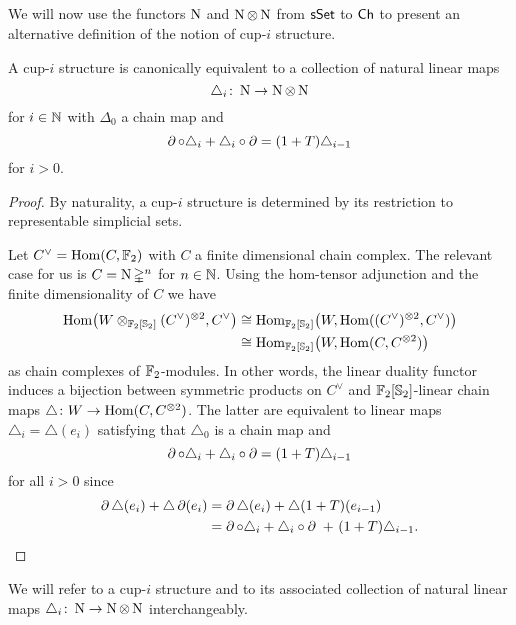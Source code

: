 
\subsection{}

We will now use the functors $\operatorname{N}$ and $\operatorname{N} \otimes \operatorname{N}$ from $\mathsf{sSet}$ to $\mathsf{Ch}$ to present an alternative definition of the notion of cup-$i$ structure.

\begin{lemma} \label{l:cup-i construction coalgebra}
	A cup-$i$ structure is canonically equivalent to a collection of natural linear maps
	\[
	\triangle_i \colon \operatorname{N} \to \operatorname{N} \otimes \operatorname{N}
	\]
	for $i \in \mathbb{N}$ with $\Delta_0$ a chain map and
	\[
	\operatorname{\partial} \circ \triangle_i + \triangle_i \circ \operatorname{\partial} =
	(1+T) \triangle_{i-1}
	\]
	for $i > 0$.
\end{lemma}

\begin{proof}
	By naturality, a cup-$i$ structure is determined by its restriction to representable simplicial sets.

	Let $C^\vee = \mathrm{Hom}(C, {\mathbb{F}_2})$ with $C$ a finite dimensional chain complex.
	The relevant case for us is $C = \operatorname{N} \mathbb{\Delta}^n$ for $n \in \mathbb{N}$.
	Using the hom-tensor adjunction and the finite dimensionality of $C$ we have
	\begin{align*}
	\mathrm{Hom} \big(W \otimes_{{\mathbb{F}_2}[\mathbb{S}_2]} (C^\vee)^{\otimes 2}, C^\vee \big) & \cong
	\mathrm{Hom}_{{\mathbb{F}_2}[\mathbb{S}_2]} \big( W, \mathrm{Hom}((C^\vee)^{\otimes 2}, C^\vee) \big) \\ & \cong
	\mathrm{Hom}_{{\mathbb{F}_2}[\mathbb{S}_2]} \big( W, \mathrm{Hom}(C, C^{\otimes 2}) \big)
	\end{align*}
	as chain complexes of ${\mathbb{F}_2}$-modules.
	In other words, the linear duality functor induces a bijection between symmetric products on $C^\vee$ and ${\mathbb{F}_2}[\mathbb{S}_2]$-linear chain maps $\triangle \colon W \to \mathrm{Hom}(C, C^{\otimes 2})$.
	The latter are equivalent to linear maps $\triangle_i = \triangle(e_i)$ satisfying that $\triangle_0$ is a chain map and
	\[
	\operatorname{\partial} \circ \triangle_i + \triangle_i \circ \operatorname{\partial} =
	(1+T) \triangle_{i-1}
	\]
	for all $i > 0$ since
	\begin{align*}
	\operatorname{\partial} \triangle (e_i) + \triangle \operatorname{\partial}(e_i) &=
	\operatorname{\partial} \triangle (e_i) + \triangle (1+T) (e_{i-1}) \\ &=
	\operatorname{\partial} \circ \triangle_i + \triangle_i \circ \operatorname{\partial} \ +\ (1+T) \triangle_{i-1}.
	\end{align*}
\end{proof}

We will refer to a cup-$i$ structure and to its associated collection of natural linear maps $\triangle_i \colon \operatorname{N} \to \operatorname{N} \otimes \operatorname{N}$ interchangeably.

